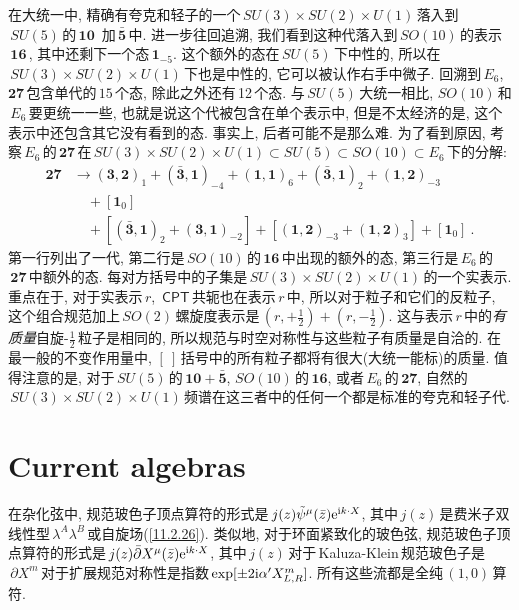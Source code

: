 在大统一中, 精确有夸克和轻子的一个$\,SU(3)\times SU(2)\times U(1)\,$落入到$\,SU(5)\,$的$\,\mathbf{10}\,$%
加$\,\bar{\mathbf{5}}\,$中. 进一步往回追溯, 我们看到这种代落入到$\,SO(10)\,$的表示$\,\mathbf{16}\,$, 其中还剩下一个态$\,\mathbf{1}_{-5}$. 这个额外的态在$\,SU(5)\,$下中性的, 所以在$\,SU(3)\times SU(2)\times U(1)\,$下也是中性的, 它可以被认作右手中微子. 回溯到$\,E_{6}$, $\mathbf{27}\,$包含单代的$\,15\,$个态, 除此之外还有\,12\,个态. 与$\,SU(5)\,$大统一相比, $SO(10)\,$和$\,E_{6}\,$要更统一一些, 也就是说这个代被包含在单个表示中, 但是不太经济的是, 这个表示中还包含其它没有看到的态. 事实上, 后者可能不是那么难. 为了看到原因, 考察$\,E_{6}\,$的$\,\mathbf{27}\,$在$\,SU(3)\times SU(2)\times U(1)\subset SU(5)\subset SO(10)\subset E_{6}\,$下的分解:
\begin{align}
    \mathbf{27} &\to (\mathbf{3},\mathbf{2})_{1} + (\bar{\mathbf{3}},\mathbf{1})_{-4}
    +(\mathbf{1},\mathbf{1})_{6} + (\bar{\mathbf{3}},\mathbf{1})_{2}+(\mathbf{1},\mathbf{2})_{-3} \nonumber \\
    &\quad + [\mathbf{1}_{0}] \nonumber \\
    &\quad +[(\bar{\mathbf{3}},\mathbf{1})_{2}+(\mathbf{3},\mathbf{1})_{-2}]
    +[(\mathbf{1},\mathbf{2})_{-3}+(\mathbf{1},\mathbf{2})_{3}] + [\mathbf{1}_{0}] \:. \label{11.4.25}
\end{align}
第一行列出了一代, 第二行是$\,SO(10)\,$的$\,\mathbf{16}\,$中出现的额外的态, 第三行是$\,E_{6}\,$的$\,\mathbf{27}\,$中额外的态. 每对方括号中的子集是$\,SU(3)\times SU(2)\times U(1)\,$的一个实表示. 重点在于, 对于实表示$\,r$, $\,\textsf{CPT}\,$共轭也在表示$\,r\,$中, 所以对于粒子和它们的反粒子, 这个组合规范加上$\,SO(2)\,$螺旋度表示是$\,(r,+\frac{1}{2})+(r,-\frac{1}{2})$. 这与表示$\,r\,$中的{\emph{有质量}}自旋-$\frac{1}{2}\,$粒子是相同的, 所以规范与时空对称性与这些粒子有质量是自洽的. 在最一般的不变作用量中, $[\:]\,$括号中的所有粒子都将有很大(大统一能标)的质量. 值得注意的是, 对于$\,SU(5)\,$的$\,\mathbf{10}+\bar{\mathbf{5}}$, $SO(10)\,$的$\,\mathbf{16}$, 或者$\,E_{6}\,$的$\,\mathbf{27}$, 自然的$\,SU(3)\times SU(2)\times U(1)\,$频谱在这三者中的任何一个都是标准的夸克和轻子代.

\section{Current algebras}

在杂化弦中, 规范玻色子顶点算符的形式是$\,j(z)\tilde{\psi}^{\mu}(\bar{z})\mathrm{e}^{\mathrm{i} k\cdot X}$, 其中$\,j(z)\,$是费米子双线性型$\,\lambda^{A}\lambda^{B}\,$或自旋场(\ref{11.2.26}). 类似地, 对于环面紧致化的玻色弦, 规范玻色子顶点算符的形式是$\,j(z)\bar{\partial}X^{\mu}(\bar{z})\mathrm{e}^{\mathrm{i} k\cdot X}$, 其中$\,j(z)\,$对于\,Kaluza-Klein\,规范玻色子是$\,\partial X^{m}\,$对于扩展规范对称性是指数$\,\exp[\pm 2\mathrm{i}\alpha^{\prime}X^{m}_{L,R}]$. 所有这些流都是全纯$\,(1,0)\,$算符.

